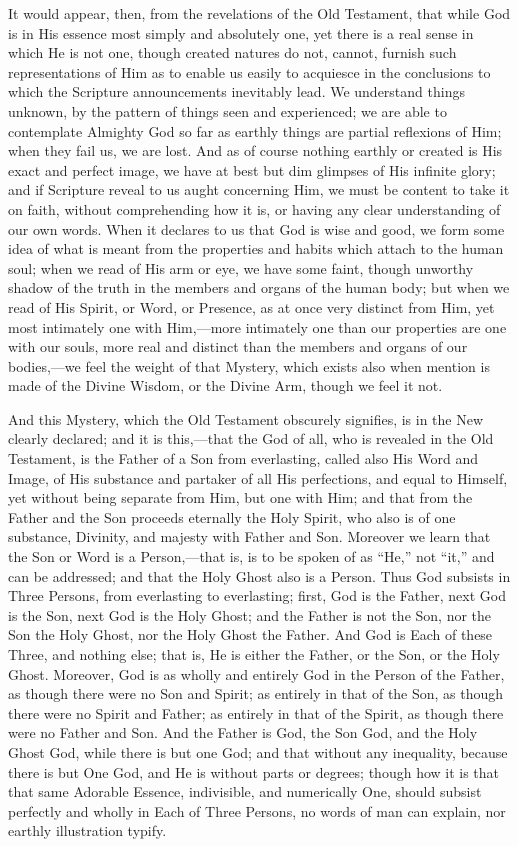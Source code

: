 It would appear, then, from the revelations of the Old Testament,
that while God is in His essence most simply and absolutely one, yet
there is a real sense in which He is not one, though created natures
do not, cannot, furnish such representations of Him as to enable us
easily to acquiesce in the conclusions to which the Scripture
announcements inevitably lead. We understand things unknown, by the
pattern of things seen and experienced; we are able to contemplate
Almighty God so far as earthly things are partial reflexions of Him;
when they fail us, we are lost. And as of course nothing earthly or
created is His exact and perfect image, we have at best but dim
glimpses of His infinite glory; and if Scripture reveal to us aught
concerning Him, we must be content to take it on faith, without
comprehending how it is, or having any clear understanding of our own
words. When it declares to us that God is wise and good, we form some
idea of what is meant from the properties and habits which attach to
the human soul; when we read of His arm or eye, we have some faint,
though unworthy shadow of the truth in the members and organs of the
human body; but when we read of His Spirit, or Word, or Presence, as
at once very distinct from Him, yet most intimately one with Him,—more
intimately one than our properties are one with our souls, more real
and distinct than the members and organs of our bodies,—we feel the
weight of that Mystery, which exists also when mention is made of the
Divine Wisdom, or the Divine Arm, though we feel it not.

And this Mystery, which the Old Testament obscurely signifies, is
in the New clearly declared; and it is this,—that the God of all,
who is revealed in the Old Testament, is the Father of a Son from
everlasting, called also His Word and Image, of His substance and
partaker of all His perfections, and equal to Himself, yet without
being separate from Him, but one with Him; and that from the Father
and the Son proceeds eternally the Holy Spirit, who also is of one
substance, Divinity, and majesty with Father and Son. Moreover we
learn that the Son or Word is a Person,—that is, is to be spoken of
as ``He,'' not ``it,'' and can be addressed; and that
the Holy Ghost also is a Person. Thus God subsists in Three Persons,
from everlasting to everlasting; first, God is the Father, next God is
the Son, next God is the Holy Ghost; and the Father is not the Son,
nor the Son the Holy Ghost, nor the Holy Ghost the Father. And God is
Each of these Three, and nothing else; that is, He is either the
Father, or the Son, or the Holy Ghost. Moreover, God is as wholly and
entirely God in the Person of the Father, as though there were no Son
and Spirit; as entirely in that of the Son, as though there were no
Spirit and Father; as entirely in that of the Spirit, as though there
were no Father and Son. And the Father is God, the Son God, and the
Holy Ghost God, while there is but one God; and that without any
inequality, because there is but One God, and He is without parts or
degrees; though how it is that that same Adorable Essence,
indivisible, and numerically One, should subsist perfectly and wholly
in Each of Three Persons, no words of man can explain, nor earthly
illustration typify.

